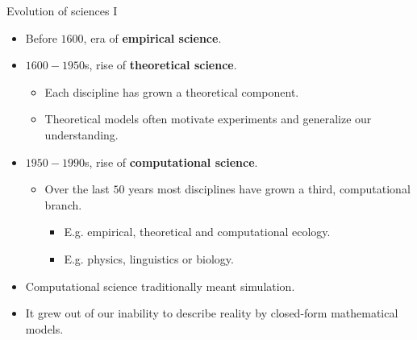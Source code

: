 \documentclass[aspectratio=169,t]{beamer}
\begin{document}
  { 
    \begin{frame}{Evolution of sciences I}
        \begin{itemize}
            \item Before $1600$, era of \textbf{empirical science}.
            \item $1600-1950$s, rise of \textbf{theoretical science}.
                  \begin{itemize}
                      \item Each discipline has grown a theoretical component.
                      \item Theoretical models often motivate experiments and generalize our understanding.
                  \end{itemize}
            \item $1950-1990$s, rise of \textbf{computational science}.
                  \begin{itemize}
                      \item Over the last $50$ years most disciplines have grown a third, computational branch.
                      \begin{itemize}
                          \item E.g. empirical, theoretical and computational ecology.
                          \item E.g. physics, linguistics or biology.
                      \end{itemize}
                  \end{itemize}
            \item Computational science traditionally meant simulation.
            \item It grew out of our inability to describe reality by closed-form mathematical models.
        \end{itemize}
    \end{frame}
  }
\end{document}
